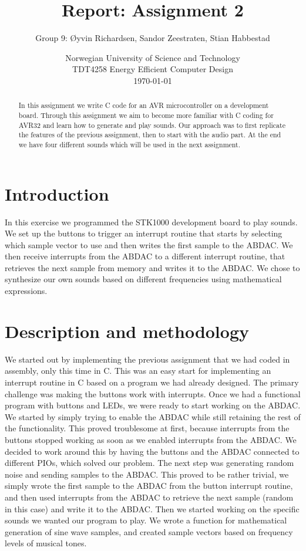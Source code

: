 \documentclass[a4paper,11pt]{article}
\title{\textbf{Report: Assignment 2}}
\author{Group 9: \O yvin Richardsen, Sandor Zeestraten, Stian Habbestad}
\date{{Norwegian University of Science and Technology \\
TDT4258 Energy Efficient Computer Design \\}
\today}
\begin{document}
\maketitle

\begin{abstract}
In this assignment we write C code for an AVR microcontroller on a development board. Through this assignment we aim to become more familiar with C coding for AVR32 and learn how to generate and play sounds. Our approach was to first replicate the features of the previous assignment, then to start with the audio part. At the end we have four different sounds which will be used in the next assignment.
\end{abstract}

\tableofcontents
\newpage

\section{Introduction}

In this exercise we programmed the STK1000 development board to play sounds. We set up the buttons to trigger an interrupt routine that starts by selecting which sample vector to use and then writes the first sample to the ABDAC. We then receive interrupts from the ABDAC to a different interrupt routine, that retrieves the next sample from memory and writes it to the ABDAC. We chose to synthesize our own sounds based on different frequencies using mathematical expressions. 


\section{Description and methodology}
We started out by implementing the previous assignment that we had coded in assembly, only this time in C. This was an easy start for implementing an interrupt routine in C based on a program we had already designed. The primary challenge was making the buttons work with interrupts. Once we had a functional program with buttons and LEDs, we were ready to start working on the ABDAC. We started by simply trying to enable the ABDAC while still retaining the rest of the functionality. This proved troublesome at first, because interrupts from the buttons stopped working as soon as we enabled interrupts from the ABDAC. We decided to work around this by having the buttons and the ABDAC connected to different PIOs, which solved our problem. The next step was generating random noise and sending samples to the ABDAC. This proved to be rather trivial, we simply wrote the first sample to the ABDAC from the button interrupt routine, and then used interrupts from the ABDAC to retrieve the next sample (random in this case) and write it to the ABDAC. Then we started working on the specific sounds we wanted our program to play. We wrote a function for mathematical generation of sine wave samples, and created sample vectors based on frequency levels of musical tones. 
\end{document}
